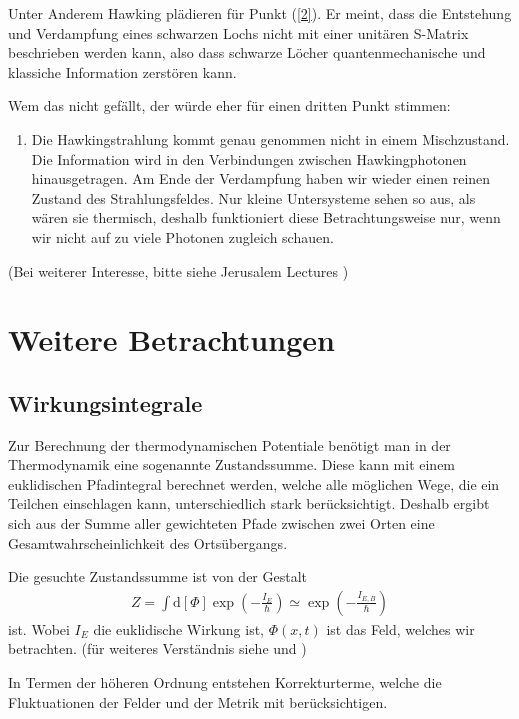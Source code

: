\documentclass[ngerman]{scrartcl}
\newcommand{\diff}{\mathrm{d}}
\begin{document}
Unter Anderem Hawking plädieren für Punkt (\ref{2}). Er meint, dass die Entstehung und Verdampfung eines schwarzen Lochs nicht mit einer unitären S-Matrix beschrieben werden kann, also dass schwarze Löcher quantenmechanische und klassiche Information zerstören kann. 

Wem das nicht gefällt, der würde eher für einen dritten Punkt stimmen:
	\begin{enumerate}[(3)]
		\item Die Hawkingstrahlung kommt genau genommen nicht in einem Mischzustand. Die Information wird in den Verbindungen zwischen Hawkingphotonen hinausgetragen. Am Ende der Verdampfung haben wir wieder einen reinen Zustand des Strahlungsfeldes. Nur kleine Untersysteme sehen so aus, als wären sie thermisch, deshalb funktioniert diese Betrachtungsweise nur, wenn wir nicht auf zu viele Photonen zugleich schauen. 
	\end{enumerate}   
(Bei weiterer Interesse, bitte siehe Jerusalem Lectures \cite{JerusalemsLectures})
	
\section{Weitere Betrachtungen}
	\subsection{Wirkungsintegrale}
	Zur Berechnung der thermodynamischen Potentiale benötigt man in der Thermodynamik eine sogenannte Zustandssumme. Diese kann mit einem euklidischen Pfadintegral berechnet werden, welche alle möglichen Wege, die ein Teilchen einschlagen kann, unterschiedlich stark berücksichtigt. Deshalb ergibt sich aus der Summe aller gewichteten Pfade zwischen zwei Orten eine Gesamtwahrscheinlichkeit des Ortsübergangs.
	
	Die gesuchte Zustandssumme ist von der Gestalt 
		\begin{align}
			Z = \int \diff [\Phi] \exp \left(- \frac{I_E}{\hbar}\right) 
			\simeq \exp \left(- \frac{I_{E,B}}{\hbar}\right)
		\end{align}
	ist. Wobei $I_E$ die euklidische Wirkung ist, $\Phi(x,t)$ ist das Feld, welches wir betrachten. (für weiteres Verständnis siehe \cite{Gebhardt} und \cite{Pfadintegral})
	
	In Termen der höheren Ordnung entstehen Korrekturterme, welche die Fluktuationen der Felder und der  Metrik mit berücksichtigen.
	
\end{document}
